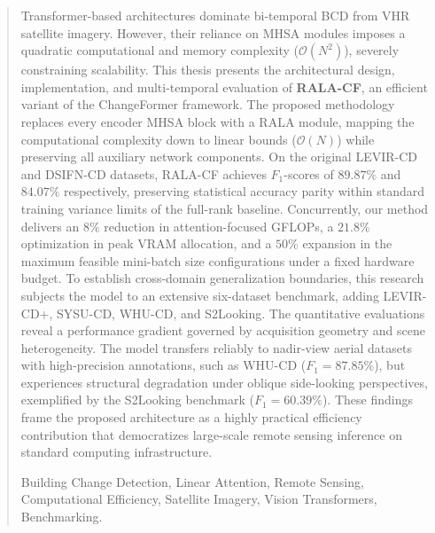 \begin{abstract}
Transformer-based architectures dominate bi-temporal \ac{BCD} from \ac{VHR} satellite imagery. However, their reliance on \ac{MHSA} modules imposes a quadratic computational and memory complexity ($\mathcal{O}(N^2)$), severely constraining scalability. This thesis presents the architectural design, implementation, and multi-temporal evaluation of \textbf{\ac{RALA-CF}}, an efficient variant of the ChangeFormer framework. The proposed methodology replaces every encoder \ac{MHSA} block with a \ac{RALA} module, mapping the computational complexity down to linear bounds ($\mathcal{O}(N)$) while preserving all auxiliary network components. On the original LEVIR-CD and DSIFN-CD datasets, \ac{RALA-CF} achieves $F_1$-scores of $89.87\%$ and $84.07\%$ respectively, preserving statistical accuracy parity within standard training variance limits of the full-rank baseline. Concurrently, our method delivers an $8\%$ reduction in attention-focused \ac{GFLOPs}, a $21.8\%$ optimization in peak \ac{VRAM} allocation, and a $50\%$ expansion in the maximum feasible mini-batch size configurations under a fixed hardware budget. To establish cross-domain generalization boundaries, this research subjects the model to an extensive six-dataset benchmark, adding LEVIR-CD+, SYSU-CD, WHU-CD, and S2Looking. The quantitative evaluations reveal a performance gradient governed by acquisition geometry and scene heterogeneity. The model transfers reliably to nadir-view aerial datasets with high-precision annotations, such as WHU-CD ($F_1 = 87.85\%$), but experiences structural degradation under oblique side-looking perspectives, exemplified by the S2Looking benchmark ($F_1 = 60.39\%$). These findings frame the proposed architecture as a highly practical efficiency contribution that democratizes large-scale remote sensing inference on standard computing infrastructure.

\vspace{0.8cm}
 Building Change Detection, Linear Attention, Remote Sensing, Computational Efficiency, Satellite Imagery, Vision Transformers, Benchmarking.
\end{abstract}
